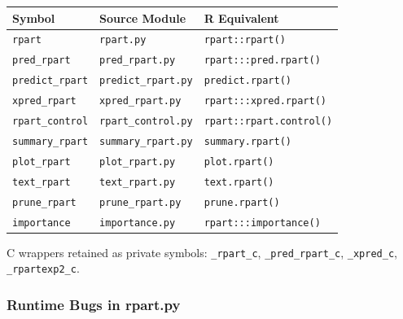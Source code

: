 \documentclass[12pt]{article}
\begin{document}
\medskip
\begin{center}
\begin{tabular}{lll}
\toprule
Symbol & Source Module & R Equivalent \\
\midrule
\texttt{rpart} & \texttt{rpart.py} & \texttt{rpart::rpart()} \\
\texttt{pred\_rpart} & \texttt{pred\_rpart.py} & \texttt{rpart:::pred.rpart()} \\
\texttt{predict\_rpart} & \texttt{predict\_rpart.py} & \texttt{predict.rpart()} \\
\texttt{xpred\_rpart} & \texttt{xpred\_rpart.py} & \texttt{rpart:::xpred.rpart()} \\
\texttt{rpart\_control} & \texttt{rpart\_control.py} & \texttt{rpart::rpart.control()} \\
\texttt{summary\_rpart} & \texttt{summary\_rpart.py} & \texttt{summary.rpart()} \\
\texttt{plot\_rpart} & \texttt{plot\_rpart.py} & \texttt{plot.rpart()} \\
\texttt{text\_rpart} & \texttt{text\_rpart.py} & \texttt{text.rpart()} \\
\texttt{prune\_rpart} & \texttt{prune\_rpart.py} & \texttt{prune.rpart()} \\
\texttt{importance} & \texttt{importance.py} & \texttt{rpart:::importance()} \\
\bottomrule
\end{tabular}
\end{center}
\medskip

C wrappers retained as private symbols: \texttt{\_rpart\_c}, \texttt{\_pred\_rpart\_c}, \texttt{\_xpred\_c}, \texttt{\_rpartexp2\_c}.

\subsubsection{Runtime Bugs in rpart.py}
\end{document}
